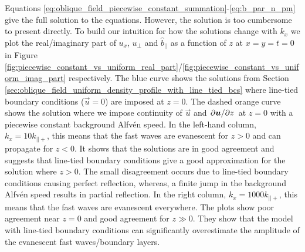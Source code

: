 Equations \eqref{eq:oblique_field_piecewise_constant_summation}-\eqref{eq:b_par_n_pm} give the full solution to the equations. However, the solution is too cumbersome to present directly.  To build our intuition for how the solutions change with $k_x$ we plot the real/imaginary part of $u_x$, $u_\perp$ and $\hat{b}_{||}$  as a function of $z$ at $x=y=t=0$ in Figure \ref{fig:piecewise_constant_vs_uniform_real_part}/\ref{fig:piecewise_constant_vs_uniform_imag_part} respectively. The blue curve shows the solutions from Section \ref{sec:oblique_field_uniform_density_profile_with_line_tied_bcs} where line-tied boundary conditions ($\vec{u}=0$) are imposed at $z=0$. The dashed orange curve shows the solution where we impose continuity of $\vec{u}$ and $\pdv*{\boldsymbol{u}}{z}$ at $z=0$ with a piecewise constant background Alfv\'en speed. In the left-hand column, $k_x=10k_{||+}$, this means that the fast waves are evanescent for $z>0$ and can propagate for $z<0$. It shows that the solutions are in good agreement and suggests that line-tied boundary conditions give a good approximation for the solution where $z>0$. The small disagreement occurs due to line-tied boundary conditions causing perfect reflection, whereas, a finite jump in the background Alfv\'en speed results in partial reflection. In the right column, $k_x=1000k_{||+}$, this means that the fast waves are evanescent everywhere. The plots show poor agreement near $z=0$ and good agreement for $z\gg0$. They show that the model with line-tied boundary conditions can significantly overestimate the amplitude of the evanescent fast waves/boundary layers.

